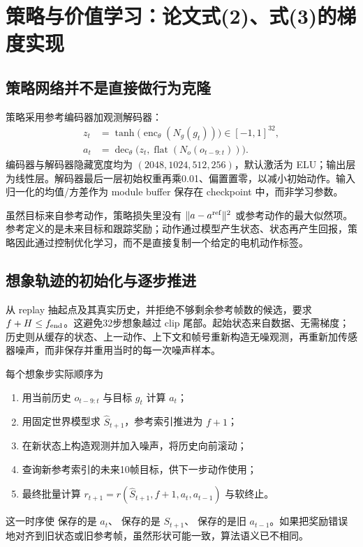 \section{策略与价值学习：论文式(2)、式(3)的梯度实现}\label{sec:actor}
\subsection{策略网络并不是直接做行为克隆}
策略采用参考编码器加观测解码器：
\begin{align}
 z_t&=\tanh\big(\operatorname{enc}_\theta(N_g(g_t))\big)\in[-1,1]^{32},\\
 a_t&=\operatorname{dec}_\theta\big(z_t,\operatorname{flat}(N_o(o_{t-9:t}))\big).
\end{align}
编码器与解码器隐藏宽度均为 $(2048,1024,512,256)$，默认激活为 ELU；输出层为线性层。解码器最后一层初始权重再乘0.01、偏置置零，以减小初始动作。输入归一化的均值/方差作为 module buffer 保存在 checkpoint 中，而非学习参数。

虽然目标来自参考动作，策略损失里没有 $\|a-a^{\rm ref}\|^2$ 或参考动作的最大似然项。参考定义的是未来目标和跟踪奖励；动作通过模型产生状态、状态再产生回报，策略因此通过控制优化学习，而不是直接复制一个给定的电机动作标签。

\subsection{想象轨迹的初始化与逐步推进}
 从 replay 抽起点及其真实历史，并拒绝不够剩余参考帧数的候选，要求 $f+H\le f_{\rm end}$。这避免32步想象越过 clip 尾部。起始状态来自数据、无需梯度；历史则从缓存的状态、上一动作、上下文和帧号重新构造无噪观测，再重新加传感器噪声，而非保存并重用当时的每一次噪声样本。

每个想象步实际顺序为
\begin{enumerate}
\item 用当前历史 $o_{t-9:t}$ 与目标 $g_t$ 计算 $a_t$；
\item 用固定世界模型求 $\hat S_{t+1}$，参考索引推进为 $f+1$；
\item 在新状态上构造观测并加入噪声，将历史向前滚动；
\item 查询新参考索引的未来10帧目标，供下一步动作使用；
\item 最终批量计算 $r_{t+1}=r(\hat S_{t+1},f+1,a_t,a_{t-1})$ 与软终止。
\end{enumerate}
这一时序使  保存的是 $a_t$、 保存的是 $S_{t+1}$、 保存的是旧 $a_{t-1}$。如果把奖励错误地对齐到旧状态或旧参考帧，虽然形状可能一致，算法语义已不相同。

